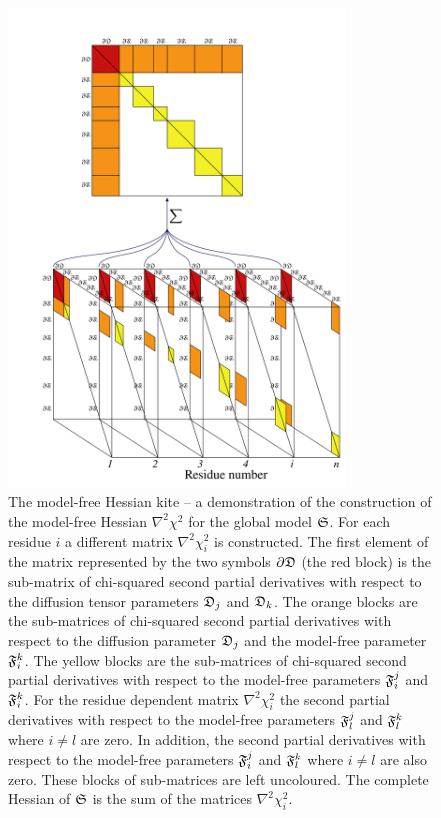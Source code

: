 \begin{figure}
\centerline{\includegraphics[width=0.8\textwidth, bb=61 11 585 789]{images/kite}}
\caption[The model-free Hessian kite.]{The model-free Hessian kite -- a demonstration of the construction of the model-free Hessian $\nabla^2 \chi^2$ for the global model $\mathfrak{S}$.  For each residue $i$ a different matrix $\nabla^2 \chi^2_i$ is constructed.  The first element of the matrix represented by the two symbols $\partial \mathfrak{D}$ (the red block) is the sub-matrix of chi-squared second partial derivatives with respect to the diffusion tensor parameters $\mathfrak{D}_j$ and $\mathfrak{D}_k$.  The orange blocks are the sub-matrices of chi-squared second partial derivatives with respect to the diffusion parameter $\mathfrak{D}_j$ and the model-free parameter $\mathfrak{F}_i^k$.  The yellow blocks are the sub-matrices of chi-squared second partial derivatives with respect to the model-free parameters $\mathfrak{F}_i^j$ and $\mathfrak{F}_i^k$.  For the residue dependent matrix $\nabla^2 \chi^2_i$ the second partial derivatives with respect to the model-free parameters $\mathfrak{F}_l^j$ and $\mathfrak{F}_l^k$ where $i \ne l$ are zero.  In addition, the second partial derivatives with respect to the model-free parameters $\mathfrak{F}_i^j$ and $\mathfrak{F}_l^k$ where $i \ne l$ are also zero.  These blocks of sub-matrices are left uncoloured.  The complete Hessian of $\mathfrak{S}$ is the sum of the matrices $\nabla^2 \chi^2_i$.}\label{fig: Hessian kite}
\end{figure}

